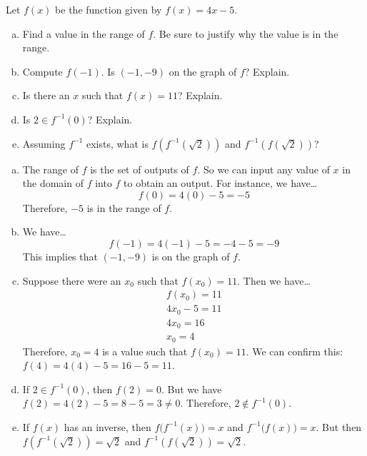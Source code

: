 \documentclass[11pt,letterpaper]{article}
\begin{document}

 Let $f(x)$ be the function given by $f(x)= 4x - 5$. 
	\begin{enumerate}[(a)]
	\item Find a value in the range of $f$. Be sure to justify why the value is in the range. 
	\item Compute $f(-1)$. Is $(-1, -9)$ on the graph of $f$? Explain. 
	\item Is there an $x$ such that $f(x)= 11$? Explain. 
	\item Is $2 \in f^{-1}(0)$? Explain. 
	\item Assuming $f^{-1}$ exists, what is $f(f^{-1}(\sqrt{2}))$ and $f^{-1}(f(\sqrt{2}))$?
	\end{enumerate} \pspace

\sol 
\begin{enumerate}[(a)]
\item The range of $f$ is the set of outputs of $f$. So we can input any value of $x$ in the domain of $f$ into $f$ to obtain an output. For instance, we have\dots
	\[
	f(0)= 4(0) - 5= -5
	\]
Therefore, $-5$ is in the range of $f$. \pspace

\item We have\dots
	\[
	f(-1)= 4(-1) - 5= -4 - 5= -9
	\]
This implies that $(-1, -9)$ is on the graph of $f$. \pspace

\item Suppose there were an $x_0$ such that $f(x_0)= 11$. Then we have\dots
	\[
	\begin{gathered}
	f(x_0)= 11 \\
	4x_0 - 5= 11 \\
	4x_0= 16 \\
	x_0= 4
	\end{gathered}
	\]
Therefore, $x_0= 4$ is a value such that $f(x_0)= 11$. We can confirm this: $f(4)= 4(4) - 5= 16 - 5= 11$. \pspace

\item If $2 \in f^{-1}(0)$, then $f(2)= 0$. But we have $f(2)= 4(2) - 5= 8 - 5= 3 \neq 0$. Therefore, $2 \notin f^{-1}(0)$. \pspace

\item If $f(x)$ has an inverse, then $f \big( f^{-1}(x) \big)= x$ and $f^{-1}\big( f(x) \big)= x$. But then $f(f^{-1}(\sqrt{2}))= \sqrt{2}$ and $f^{-1}(f(\sqrt{2}))= \sqrt{2}$. 
\end{enumerate}
\end{document}

